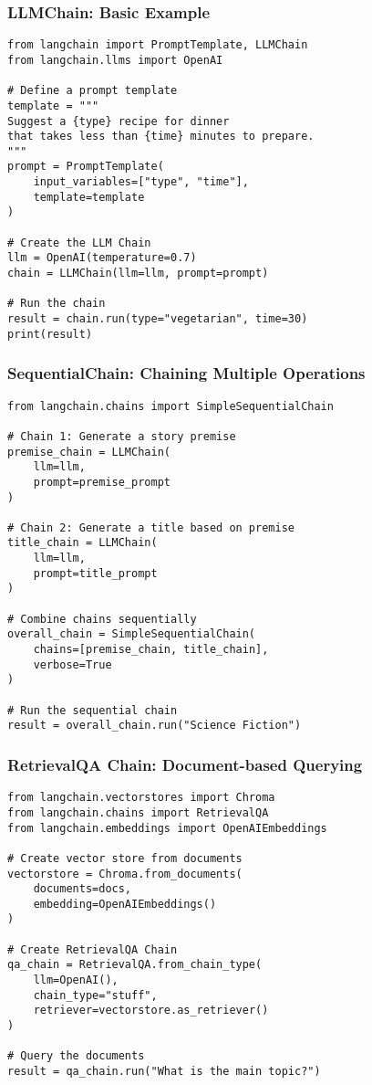 \begin{frame}[fragile]\frametitle{LLMChain: Basic Example}

\begin{lstlisting}
from langchain import PromptTemplate, LLMChain
from langchain.llms import OpenAI

# Define a prompt template
template = """
Suggest a {type} recipe for dinner 
that takes less than {time} minutes to prepare.
"""
prompt = PromptTemplate(
    input_variables=["type", "time"], 
    template=template
)

# Create the LLM Chain
llm = OpenAI(temperature=0.7)
chain = LLMChain(llm=llm, prompt=prompt)

# Run the chain
result = chain.run(type="vegetarian", time=30)
print(result)
\end{lstlisting}

\end{frame}

\begin{frame}[fragile]\frametitle{SequentialChain: Chaining Multiple Operations}

\begin{lstlisting}
from langchain.chains import SimpleSequentialChain

# Chain 1: Generate a story premise
premise_chain = LLMChain(
    llm=llm, 
    prompt=premise_prompt
)

# Chain 2: Generate a title based on premise
title_chain = LLMChain(
    llm=llm, 
    prompt=title_prompt
)

# Combine chains sequentially
overall_chain = SimpleSequentialChain(
    chains=[premise_chain, title_chain],
    verbose=True
)

# Run the sequential chain
result = overall_chain.run("Science Fiction")
\end{lstlisting}

\end{frame}

\begin{frame}[fragile]\frametitle{RetrievalQA Chain: Document-based Querying}

\begin{lstlisting}
from langchain.vectorstores import Chroma
from langchain.chains import RetrievalQA
from langchain.embeddings import OpenAIEmbeddings

# Create vector store from documents
vectorstore = Chroma.from_documents(
    documents=docs, 
    embedding=OpenAIEmbeddings()
)

# Create RetrievalQA Chain
qa_chain = RetrievalQA.from_chain_type(
    llm=OpenAI(),
    chain_type="stuff",
    retriever=vectorstore.as_retriever()
)

# Query the documents
result = qa_chain.run("What is the main topic?")
\end{lstlisting}

\end{frame}

